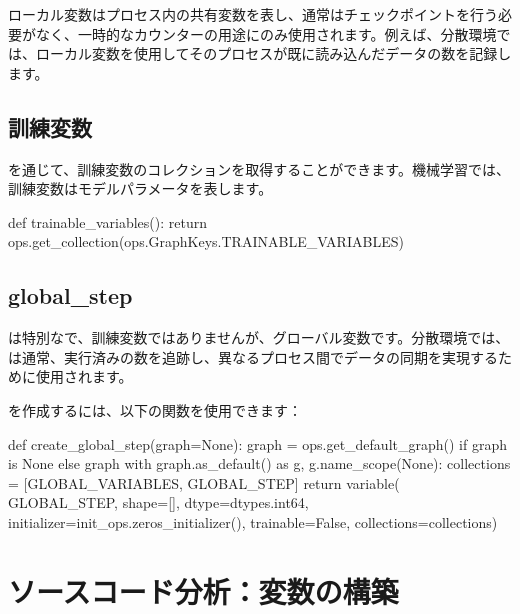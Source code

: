 \begin{content}
ローカル変数はプロセス内の共有変数を表し、通常はチェックポイントを行う必要がなく、一時的なカウンターの用途にのみ使用されます。例えば、分散環境では、ローカル変数を使用してそのプロセスが既に読み込んだデータの数を記録します。

\subsection{訓練変数}

を通じて、訓練変数のコレクションを取得することができます。機械学習では、訓練変数はモデルパラメータを表します。

\begin{leftbar}
\begin{python}
def trainable_variables():
  return ops.get_collection(ops.GraphKeys.TRAINABLE_VARIABLES)
\end{python}
\end{leftbar}

\subsection{global\_step}

は特別なで、訓練変数ではありませんが、グローバル変数です。分散環境では、は通常、実行済みの数を追跡し、異なるプロセス間でデータの同期を実現するために使用されます。

を作成するには、以下の関数を使用できます：

\begin{leftbar}
\begin{python}
def create_global_step(graph=None):
  graph = ops.get_default_graph() if graph is None else graph
  with graph.as_default() as g, g.name_scope(None):
    collections = [GLOBAL_VARIABLES, GLOBAL_STEP]
    return variable(
        GLOBAL_STEP,
        shape=[],
        dtype=dtypes.int64,
        initializer=init_ops.zeros_initializer(),
        trainable=False,
        collections=collections)
\end{python}
\end{leftbar}

\end{content}

\section{ソースコード分析：変数の構築}

